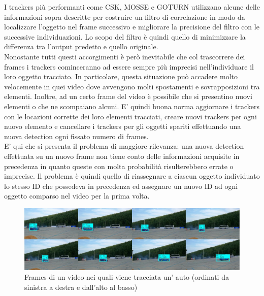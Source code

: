 I trackers più performanti come CSK, MOSSE\cite{mosse} e GOTURN\cite{goturn} utilizzano alcune delle informazioni sopra descritte per costruire un filtro di correlazione in modo da localizzare l'oggetto nel frame successivo e migliorare la precisione del filtro con le successive individuazioni. Lo scopo del filtro è quindi quello di minimizzare la differenza tra l'output predetto e quello originale.\\ Nonostante tutti questi accorgimenti è però inevitabile che col trascorrere dei frames i trackers cominceranno ad essere sempre più imprecisi nell'individuare il loro oggetto tracciato. In particolare, questa situazione può accadere molto velocemente in quei video dove avvengono molti spostamenti e sovrapposizioni tra elementi. Inoltre, ad un certo frame del video è possibile che si presentino nuovi elementi o che ne scompaiano alcuni. E' quindi buona norma aggiornare i trackers con le locazioni corrette dei loro elementi tracciati, creare nuovi trackers per ogni nuovo elemento e cancellare i trackers per gli oggetti spariti effettuando una nuova detection ogni fissato numero di frames.\\
E' qui che si presenta il problema di maggiore rilevanza: una nuova detection effettuata su un nuovo frame non tiene conto delle informazioni acquisite in precedenza in quanto queste con molta probabilità risulterebbero errate o imprecise. Il problema è quindi quello di riassegnare a ciascun oggetto individuato lo stesso ID che possedeva in precedenza ed assegnare un nuovo ID ad ogni oggetto comparso nel video per la prima volta.
\begin{figure}[H]
	\centering
	\includegraphics[width=1\linewidth]{images/esempio-tracking.jpg}
	\caption{Frames di un video nei quali viene tracciata un' auto (ordinati da sinistra a destra e dall'alto al basso)}
	\label{Esempio di un'immagine in alta risoluzione frammentata in regioni senza sovrapposizioni}
\end{figure}
